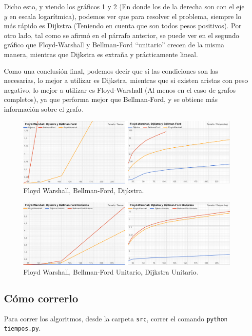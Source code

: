 \documentclass[a4paper,10pt]{article}
\begin{document}
	Dicho esto, y viendo los gráficos \ref{fig:fw-bf-d} y \ref{fig:fw-bfu-du} (En donde los de la derecha son con el eje $y$ en escala logarítmica), podemos ver que para resolver el problema, siempre lo más rápido es Dijkstra (Teniendo en cuenta que son todos pesos positivos). Por otro lado, tal como se afirmó en el párrafo anterior, se puede ver en el segundo gráfico que Floyd-Warshall y Bellman-Ford ``unitario'' crecen de la misma manera, mientras que Dijkstra es extraña y prácticamente lineal.

	Como una conclusión final, podemos decir que si las condiciones son las necesarias, lo mejor a utilizar es Dijkstra, mientras que si existen aristas con peso negativo, lo mejor a utilizar es Floyd-Warshall (Al menos en el caso de grafos completos), ya que performa mejor que Bellman-Ford, y se obtiene más información sobre el grafo.

	\begin{figure}[!htb]
		\centering
		\includegraphics[scale=0.4]{images/grafico-fw-bf-d-doble.png}
		\caption{Floyd Warshall, Bellman-Ford, Dijkstra.}
		\label{fig:fw-bf-d}
	\end{figure}

	\begin{figure}[!htb]
		\centering
		\includegraphics[scale=0.4]{images/grafico-fw-bfu-du-doble.png}
		\caption{Floyd Warshall, Bellman-Ford Unitario, Dijkstra Unitario.}
		\label{fig:fw-bfu-du}
	\end{figure}

\subsection{Cómo correrlo}
	Para correr los algoritmos, desde la carpeta \texttt{src}, correr el comando \texttt{python tiempos.py}.
\end{document}
